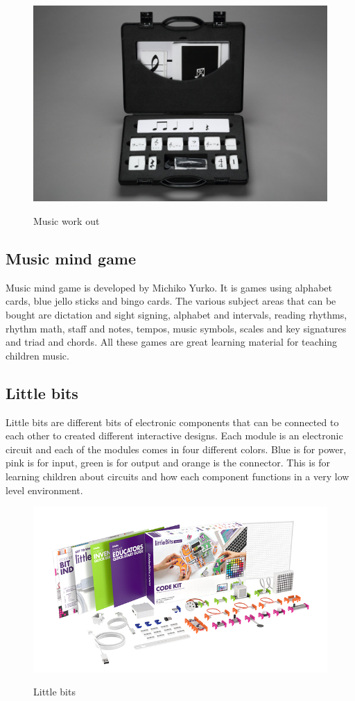 \begin{figure}[H]
	\centering
	\includegraphics[width=0.7\linewidth]{figure/Analysis/musicworkout}
	\label{fig:musicworkout}
	\caption{Music work out}
\end{figure}

\subsection{Music mind game}
Music mind game is developed by Michiko Yurko. It is games using alphabet cards, blue jello sticks and bingo cards. The various subject areas that can be bought are dictation and sight signing, alphabet and intervals, reading rhythms, rhythm math, staff and notes, tempos, music symbols, scales and key signatures and triad and chords. All these games are great learning material for teaching children music. 

\subsection{Little bits}
Little bits are different bits of electronic components that can be connected to each other to created different interactive designs. Each module is an electronic circuit and each of the modules comes in four different colors. Blue is for power, pink is for input, green is for output and orange is the connector. This is for learning children about circuits and how each component functions in a very low level environment. 

\begin{figure}[H]
	\centering
	\includegraphics[width=0.7\linewidth]{figure/Analysis/littlebits}
	\label{fig:littlebits}
	\caption{Little bits}
\end{figure}


